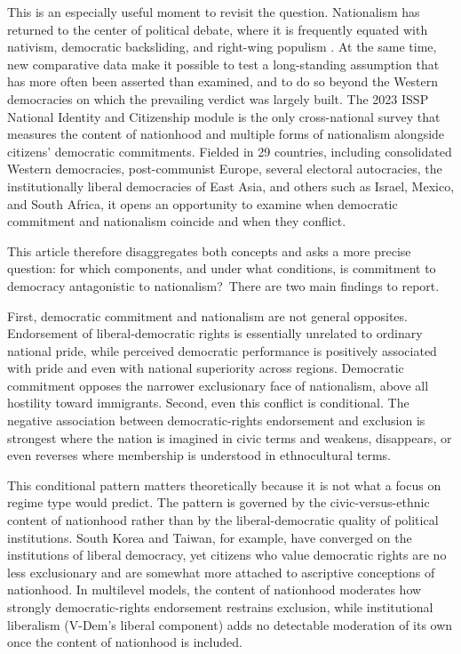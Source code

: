 This is an especially useful moment to revisit the question. Nationalism has returned to the center of political debate, where it is frequently equated with nativism, democratic backsliding, and right-wing populism \citep{mudde2007, brubaker2017}. At the same time, new comparative data make it possible to test a long-standing assumption that has more often been asserted than examined, and to do so beyond the Western democracies on which the prevailing verdict was largely built. The 2023 ISSP National Identity and Citizenship module is the only cross-national survey that measures the content of nationhood and multiple forms of nationalism alongside citizens' democratic commitments. Fielded in 29 countries, including consolidated Western democracies, post-communist Europe, several electoral autocracies, the institutionally liberal democracies of East Asia, and others such as Israel, Mexico, and South Africa, it opens an opportunity to examine when democratic commitment and nationalism coincide and when they conflict.

This article therefore disaggregates both concepts and asks a more precise question: for which components, and under what conditions, is commitment to democracy antagonistic to nationalism? There are two main findings to report. 

First, democratic commitment and nationalism are not general opposites. Endorsement of liberal-democratic rights is essentially unrelated to ordinary national pride, while perceived democratic performance is positively associated with pride and even with national superiority across regions. Democratic commitment opposes the narrower exclusionary face of nationalism, above all hostility toward immigrants. Second, even this conflict is conditional. The negative association between democratic-rights endorsement and exclusion is strongest where the nation is imagined in civic terms and weakens, disappears, or even reverses where membership is understood in ethnocultural terms.

This conditional pattern matters theoretically because it is not what a focus on regime type would predict. The pattern is governed by the civic-versus-ethnic content of nationhood rather than by the liberal-democratic quality of political institutions. South Korea and Taiwan, for example, have converged on the institutions of liberal democracy, yet citizens who value democratic rights are no less exclusionary and are somewhat more attached to ascriptive conceptions of nationhood. In multilevel models, the content of nationhood moderates how strongly democratic-rights endorsement restrains exclusion, while institutional liberalism (V-Dem's liberal component) adds no detectable moderation of its own once the content of nationhood is included.

